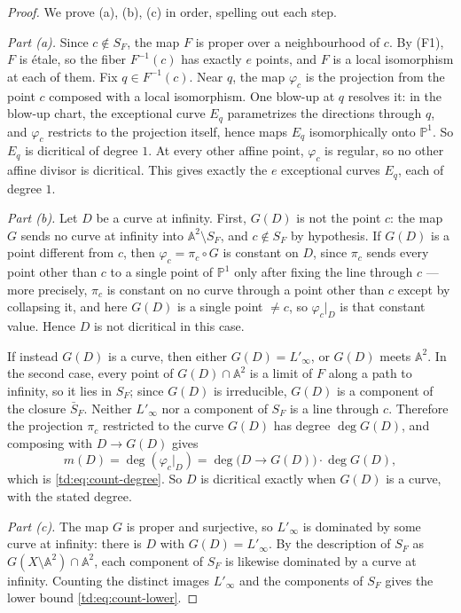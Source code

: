 \documentclass[a4paper,11pt]{article}
\theoremstyle{plain}
\theoremstyle{definition}
\theoremstyle{remark}
\begin{document}
\begin{proof}
We prove (a), (b), (c) in order, spelling out each step.

\emph{Part (a).} Since $c \notin S_F$, the map $F$ is proper over a neighbourhood of $c$.
By (F1), $F$ is \'{e}tale, so the fiber $F^{-1}(c)$ has exactly $e$ points, and $F$ is a local
isomorphism at each of them. Fix $q \in F^{-1}(c)$. Near $q$, the map $\varphi_c$ is the
projection from the point $c$ composed with a local isomorphism. One blow-up at $q$ resolves
it: in the blow-up chart, the exceptional curve $E_q$ parametrizes the directions through $q$,
and $\varphi_c$ restricts to the projection itself, hence maps $E_q$ isomorphically onto
$\mathbb{P}^1$. So $E_q$ is dicritical of degree $1$. At every other affine point,
$\varphi_c$ is regular, so no other affine divisor is dicritical. This gives exactly the $e$
exceptional curves $E_q$, each of degree $1$.

\emph{Part (b).} Let $D$ be a curve at infinity. First, $G(D)$ is not the point $c$: the map $G$
sends no curve at infinity into $\mathbb{A}^2 \setminus S_F$, and $c \notin S_F$ by hypothesis.
If $G(D)$ is a point different from $c$, then $\varphi_c = \pi_c \circ G$ is constant on $D$,
since $\pi_c$ sends every point other than $c$ to a single point of $\mathbb{P}^1$ only after
fixing the line through $c$ --- more precisely, $\pi_c$ is constant on no curve through a point
other than $c$ except by collapsing it, and here $G(D)$ is a single point $\neq c$, so
$\varphi_c|_D$ is that constant value. Hence $D$ is not dicritical in this case.

If instead $G(D)$ is a curve, then either $G(D) = L'_\infty$, or $G(D)$ meets
$\mathbb{A}^2$. In the second case, every point of $G(D) \cap \mathbb{A}^2$ is a limit of $F$
along a path to infinity, so it lies in $S_F$; since $G(D)$ is irreducible, $G(D)$ is a
component of the closure $\bar{S}_F$. Neither $L'_\infty$ nor a component of $S_F$ is a line
through $c$. Therefore the projection $\pi_c$ restricted to the curve $G(D)$ has degree
$\deg G(D)$, and composing with $D \to G(D)$ gives
\[
m(D) = \deg(\varphi_c|_D) = \deg\big(D \to G(D)\big) \cdot \deg G(D),
\]
which is \eqref{td:eq:count-degree}. So $D$ is dicritical exactly when $G(D)$ is a curve, with
the stated degree.

\emph{Part (c).} The map $G$ is proper and surjective, so $L'_\infty$ is dominated by some
curve at infinity: there is $D$ with $G(D) = L'_\infty$. By the description of $S_F$ as
$G(X \setminus \mathbb{A}^2) \cap \mathbb{A}^2$, each component of $S_F$ is likewise
dominated by a curve at infinity. Counting the distinct images $L'_\infty$ and the components
of $S_F$ gives the lower bound \eqref{td:eq:count-lower}.
\end{proof}
\end{document}
